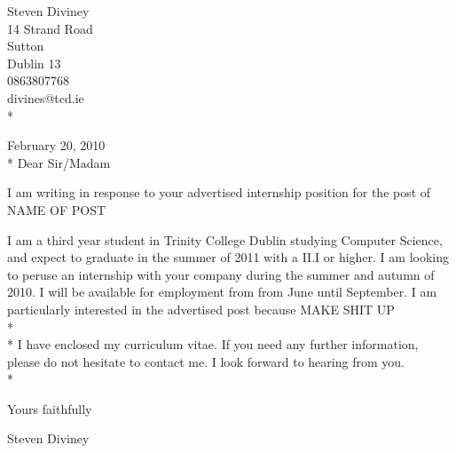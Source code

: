 \documentclass[a4paper,12pt]{article}
\begin{document}
\begin{flushright}
   Steven Diviney \\
   14 Strand Road \\
   Sutton \\
   Dublin 13 \\
   0863807768 \\
   divines@tcd.ie \\* \vspace{10 mm}
\end{flushright}
\begin{flushleft}
 
February 20, 2010\\*\vspace{10 mm}
Dear Sir/Madam
\end{flushleft}
I am writing in response to your advertised internship position for the post of NAME OF POST

I am a third year student in Trinity College Dublin studying Computer Science, and expect to graduate in the summer of 2011 with a II.I or higher.
I am looking to peruse an internship with your company during the summer and autumn of 2010. 
I will be available for employment from from June until September. I am particularly interested in the advertised post because MAKE SHIT UP\\*
\\*
I have enclosed my curriculum vitae. If you need any further information, please do not hesitate to contact me. I look forward to hearing from you.\\*

\begin{flushleft}
Yours faithfully\\\vspace{10mm}

Steven Diviney\\
\end{flushleft}
\end{document}
